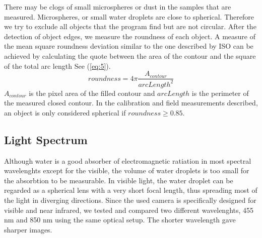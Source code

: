 There may be clogs of small microspheres or dust in the samples that are measured. Microspheres, or small water droplets are close to spherical. Therefore we try to exclude all objects that the program find but are not circular. After the detection of object edges, we measure the roundness of each object. A measure of the mean square roundness deviation similar to the one described by ISO \cite{iso12181} can be achieved by calculating the quote between the area of the contour and the square of the total arc length See (\cref{eq:5}).
\begin{equation}
roundness = 4\pi \frac{A_{contour}}{arcLength^2}
\label{eq:5}
\end{equation}
$A_{contour}$ is the pixel area of the filled contour and $arcLength$ is the perimeter of the measured closed contour. In the calibration and field measurements described, an object is only considered spherical if $roundness \geq 0.85$.


\subsection{Light Spectrum}

Although water is a good absorber of electromagnetic ratiation in most spectral wavelenghts except for the visible, the volume of water droplets is too small for the absorbtion to be measurable. In visible light, the water droplet can be regarded as a spherical lens with a very short focal length, thus spreading most of the light in diverging directions. Since the used camera is specifically designed for visible and near infrared, we tested and compared two different wavelenghts, 455 nm and 850 nm using the same optical setup. The shorter wavelength gave sharper images.

